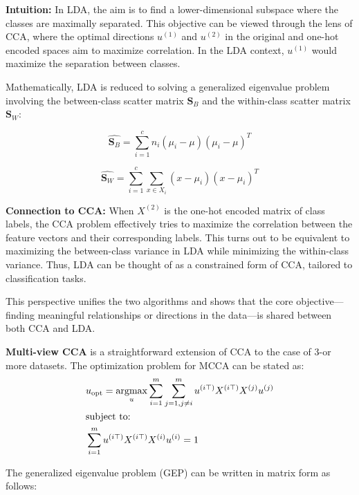 \textbf{Intuition:} In LDA, the aim is to find a lower-dimensional subspace where the classes are maximally separated. This objective can be viewed through the lens of CCA, where the optimal directions \(u^{(1)}\) and \(u^{(2)}\) in the original and one-hot encoded spaces aim to maximize correlation. In the LDA context, \(u^{(1)}\) would maximize the separation between classes.

Mathematically, LDA is reduced to solving a generalized eigenvalue problem involving the between-class scatter matrix \(\mathbf{S}_B\) and the within-class scatter matrix \(\mathbf{S}_W\):

\[
    \hat{\mathbf{S}_B} = \sum_{i=1}^{c} n_i (\mu_i - \mu)(\mu_i - \mu)^T
\]

\[
    \hat{\mathbf{S}_W} = \sum_{i=1}^{c} \sum_{x \in X_i} (x - \mu_i)(x - \mu_i)^T
\]

\textbf{Connection to CCA:} When \(X^{(2)}\) is the one-hot encoded matrix of class labels, the CCA problem effectively tries to maximize the correlation between the feature vectors and their corresponding labels.
This turns out to be equivalent to maximizing the between-class variance in LDA while minimizing the within-class variance.
Thus, LDA can be thought of as a constrained form of CCA, tailored to classification tasks.

This perspective unifies the two algorithms and shows that the core objective—finding meaningful relationships or directions in the data—is shared between both CCA and LDA.

\textbf{Multi-view CCA} is a straightforward extension of CCA to the case of 3-or more datasets.
The optimization problem for MCCA can be stated as:
\begin{align}
     & u_{\text{opt}} = \underset{u}{\mathrm{argmax}} \sum_{i=1}^{m} \sum_{j=1, j \neq i}^{m} u^{(i\top)} X^{(i\top)} X^{(j)} u^{(j)} \\
     & \text{subject to:} \notag \\
     & \sum_{i=1}^{m} u^{(i\top)} X^{(i\top)} X^{(i)} u^{(i)} = 1 \notag
\end{align}

The generalized eigenvalue problem (GEP) can be written in matrix form as follows:

